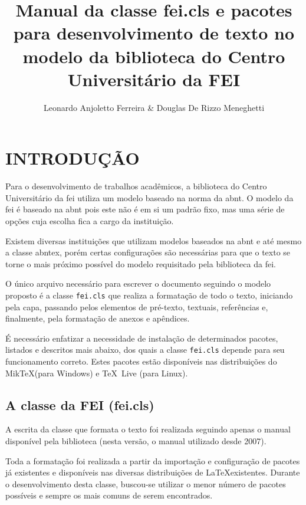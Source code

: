 \documentclass{fei}
\author{Leonardo Anjoletto Ferreira \& Douglas De Rizzo Meneghetti}
\title{Manual da classe fei.cls e pacotes para desenvolvimento de texto no modelo da biblioteca do Centro Universitário da FEI}
\begin{document}

\maketitle
\printglossaries
\sumario

\chapter{INTRODUÇÃO}

Para o desenvolvimento de trabalhos acadêmicos, a biblioteca do Centro Universitário da \gls{fei} utiliza um modelo baseado na norma da \gls{abnt}. O modelo da \gls{fei} é baseado na \gls{abnt} pois este não é em si um padrão fixo, mas uma série de opções cuja escolha fica a cargo da instituição.

Existem diversas instituições que utilizam modelos baseados na \gls{abnt} e até mesmo a classe \gls{abntex}, porém certas configurações são necessárias para que o texto se torne o mais próximo possível do modelo requisitado pela biblioteca da \gls{fei}.

O único arquivo necessário para escrever o documento seguindo o modelo proposto é a classe \texttt{fei.cls} que realiza a formatação de todo o texto, iniciando pela capa, passando pelos elementos de pré-texto, textuais, referências e, finalmente, pela formatação de anexos e apêndices.

É necessário enfatizar a necessidade de instalação de determinados pacotes, listados e descritos mais abaixo, dos quais a classe \texttt{fei.cls} depende para seu funcionamento correto. Estes pacotes estão disponíveis nas distribuições do Mik\TeX (para Windows) e \TeX~Live (para Linux).

\section{A classe da FEI (fei.cls)}

A escrita da classe que formata o texto foi realizada seguindo apenas o manual disponível pela biblioteca (nesta versão, o manual utilizado desde 2007).

Toda a formatação foi realizada a partir da importação e configuração de pacotes já existentes e disponíveis nas diversas distribuições de \LaTeX existentes. Durante o desenvolvimento desta classe, buscou-se utilizar o menor número de pacotes possíveis e sempre os mais comuns de serem encontrados.
\end{document}
